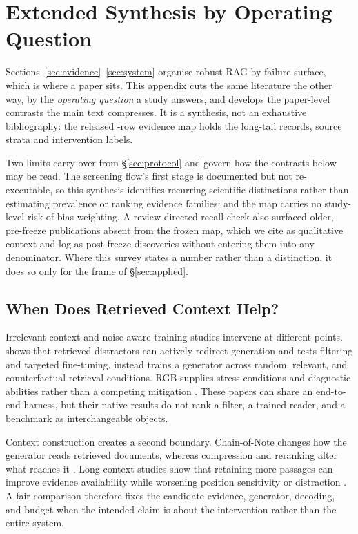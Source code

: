 

\section{Extended Synthesis by Operating Question}
\label{sec:extended-survey}

Sections~\ref{sec:evidence}--\ref{sec:system} organise robust RAG by failure
surface, which is where a paper sits. This appendix cuts the same literature the
other way, by the \emph{operating question} a study answers, and develops the
paper-level contrasts the main text compresses. It is a synthesis, not an
exhaustive bibliography: the released \MapRows{}-row evidence map holds the long-tail
records, source strata and intervention labels.

Two limits carry over from \S\ref{sec:protocol} and govern how the contrasts
below may be read. The screening flow's first stage is documented but not
re-executable, so this synthesis identifies recurring scientific distinctions
rather than estimating prevalence or ranking evidence families; and the map
carries no study-level risk-of-bias weighting. A review-directed recall check
also surfaced older, pre-freeze publications absent from the frozen map, which
we cite as qualitative context and log as post-freeze discoveries without
entering them into any denominator. Where this survey states a number rather
than a distinction, it does so only for the frame of \S\ref{sec:applied}.

\subsection{When Does Retrieved Context Help?}

Irrelevant-context and noise-aware-training studies intervene at different
points. \citet{irrelevantContext2023} shows that retrieved distractors can
actively redirect generation and tests filtering and targeted fine-tuning.
\citet{raat2024} instead trains a generator across random, relevant, and
counterfactual retrieval conditions. RGB supplies stress conditions and
diagnostic abilities rather than a competing mitigation \citep{rgb2023}.
These papers can share an end-to-end harness, but their native results do not
rank a filter, a trained reader, and a benchmark as interchangeable objects.

Context construction creates a second boundary. Chain-of-Note changes how the
generator reads retrieved documents, whereas compression and reranking alter
what reaches it \citep{chainOfNote2023,rrag044,rrag058}. Long-context studies
show that retaining more passages can improve evidence availability while
worsening position sensitivity or distraction \citep{rrag039,rrag143}. A fair
comparison therefore fixes the candidate evidence, generator, decoding, and
budget when the intended claim is about the intervention rather than the
entire system.

